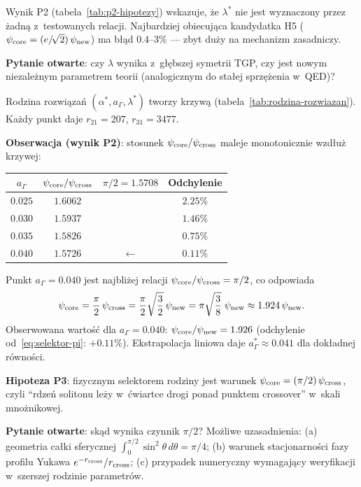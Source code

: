 \begin{problem}%
\label{prob:lambda-star}
Wynik P2 (tabela~\ref{tab:p2-hipotezy}) wskazuje, że $\lambda^*$
nie jest wyznaczony przez żadną z~testowanych relacji.
Najbardziej obiecująca kandydatka H5 ($\psi_{\rm core} = (e/\!\sqrt{2})\,\psi_{\rm new}$)
ma błąd $0.4\text{--}3\%$ — zbyt duży na mechanizm zasadniczy.

\textbf{Pytanie otwarte}: czy $\lambda$ wynika z~głębszej symetrii TGP,
czy jest nowym niezależnym parametrem teorii (analogicznym do stałej
sprzężenia w~QED)?
\end{problem}

\begin{problem}%
\label{prob:rodzina}
Rodzina rozwiązań $(\alpha^*, a_\Gamma, \lambda^*)$ tworzy krzywą
(tabela~\ref{tab:rodzina-rozwiazan}).
Każdy punkt daje $r_{21} = 207$, $r_{31} = 3477$.

\textbf{Obserwacja (wynik P2)}: stosunek $\psi_{\rm core}/\psi_{\rm cross}$
maleje monotonicz\-nie wzdłuż krzywej:

\medskip
\begin{center}\small
\begin{tabular}{@{}cccc@{}}
\toprule
$a_\Gamma$ & $\psi_{\rm core}/\psi_{\rm cross}$ & $\pi/2 = 1.5708$ & Odchylenie \\
\midrule
$0.025$ & $1.6062$ & & $2.25\%$ \\
$0.030$ & $1.5937$ & & $1.46\%$ \\
$0.035$ & $1.5826$ & & $0.75\%$ \\
$0.040$ & $1.5726$ & $\leftarrow$ & $0.11\%$ \\
\bottomrule
\end{tabular}
\end{center}
\medskip

Punkt $a_\Gamma = 0.040$ jest najbliżej relacji $\psi_{\rm core}/\psi_{\rm cross} = \pi/2$,
co odpowiada
\begin{equation}\label{eq:selektor-pi}
    \psi_{\rm core} = \frac{\pi}{2}\,\psi_{\rm cross}
    = \frac{\pi}{2}\sqrt{\frac{3}{2}}\,\psi_{\rm new}
    = \pi\sqrt{\frac{3}{8}}\;\psi_{\rm new}
    \approx 1.924\,\psi_{\rm new}.
\end{equation}
Obserwowana wartość dla $a_\Gamma=0.040$: $\psi_{\rm core}/\psi_{\rm new} = 1.926$
(odchylenie od~\eqref{eq:selektor-pi}: $+0.11\%$).
Ekstrapolacja liniowa daje $a_\Gamma^* \approx 0.041$ dla dokładnej równości.

\textbf{Hipoteza P3}: fizycznym selektorem rodziny jest warunek
$\psi_{\rm core} = (\pi/2)\,\psi_{\rm cross}$,
czyli ``rdzeń solitonu leży w~ćwiartce drogi ponad punktem crossover''
w~skali mnożnikowej.

\textbf{Pytanie otwarte}: skąd wynika czynnik $\pi/2$?
Możliwe uzasadnienia:
(a) geometria całki sferycznej $\int_0^{\pi/2} \sin^2\theta\,d\theta = \pi/4$;
(b) warunek stacjonarności fazy profilu Yukawa $e^{-r_{\rm cross}}/r_{\rm cross}$;
(c) przypadek numeryczny wymagający weryfikacji w~szerszej rodzinie parametrów.
\end{problem}


